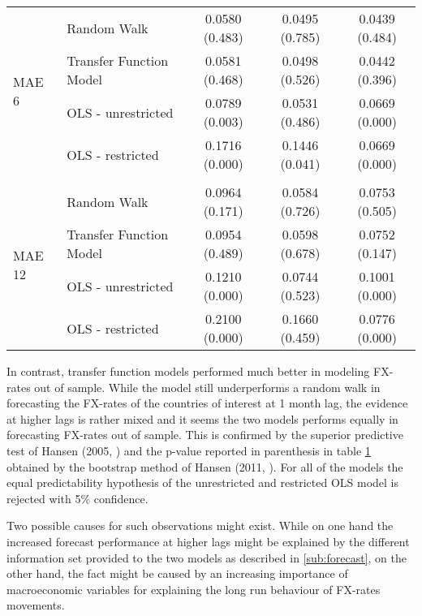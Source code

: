 \begin{table}[!ht]
\begin{tabular}{llccc}
    \\
    \multirow{4}{*}{MAE 6}        & \multicolumn{1}{l}{Random Walk}             &   0.0580 (0.483) & 0.0495 (0.785) & 0.0439 (0.484)\\
                                  & \multicolumn{1}{l}{Transfer Function Model} &   0.0581 (0.468) & 0.0498 (0.526) & 0.0442 (0.396)\\
                                  & \multicolumn{1}{l}{OLS - unrestricted}      &   0.0789 (0.003) & 0.0531 (0.486) & 0.0669 (0.000)\\
                                  & \multicolumn{1}{l}{OLS - restricted}        &   0.1716 (0.000) & 0.1446 (0.041) & 0.0669 (0.000)\\
     \\
    \multirow{4}{*}{MAE 12}       & \multicolumn{1}{l}{Random Walk}             &   0.0964 (0.171) & 0.0584 (0.726) & 0.0753 (0.505)\\
                                  & \multicolumn{1}{l}{Transfer Function Model} &   0.0954 (0.489) & 0.0598 (0.678) & 0.0752 (0.147)\\
                                  & \multicolumn{1}{l}{OLS - unrestricted}      &   0.1210 (0.000) & 0.0744 (0.523) & 0.1001 (0.000)\\
                                  & \multicolumn{1}{l}{OLS - restricted}        &   0.2100 (0.000) & 0.1660 (0.459) & 0.0776 (0.000)\\

    \bottomrule
  \end{tabular}
  \label{table:MAEunivariate}
  \vspace{2em}
\end{table}

In contrast, transfer function models performed much better in modeling FX-rates out of sample. While the model still underperforms a random walk in
forecasting the FX-rates of the countries of interest at 1 month lag, the evidence at higher lags is rather mixed and it seems the two models performs
equally in forecasting FX-rates out of sample. This is confirmed by the superior predictive test of Hansen (2005, \cite{HansenSPA}) and the p-value reported in parenthesis in table \ref{table:MAEunivariate} obtained by the bootstrap method of Hansen (2011, \cite{HansenMCS}).
For all of the models the equal predictability hypothesis of the unrestricted and restricted OLS model is rejected with 5\% confidence.

Two possible causes for such observations might exist. While on one hand the increased
forecast performance at higher lags might be explained by the different information set provided to the two models as described in \ref{sub:forecast},
on the other hand, the fact might be caused by an increasing importance of macroeconomic variables for explaining the long run behaviour
of FX-rates movements.

